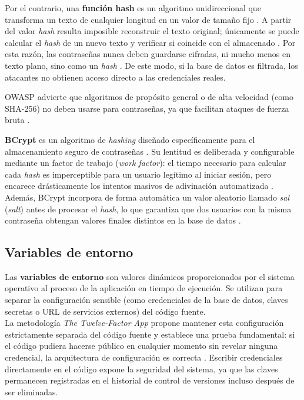 	Por el contrario, una \textbf{funci\'on hash} es un algoritmo unidireccional que transforma un texto de cualquier longitud en un valor de tamaño fijo \cite{owasp_password_storage}. A partir del valor \textit{hash} resulta imposible reconstruir el texto original; \'unicamente se puede calcular el \textit{hash} de un nuevo texto y verificar si coincide con el almacenado \cite{owasp_password_storage}. Por esta raz\'on, las contraseñas nunca deben guardarse cifradas, ni mucho menos en texto plano, sino como un \textit{hash} \cite{owasp_password_storage}. De este modo, si la base de datos es filtrada, los atacantes no obtienen acceso directo a las credenciales reales.
	
	\begin{warnbox}
		OWASP advierte que algoritmos de prop\'osito general o de alta velocidad (como SHA-256) no deben usarse para contraseñas, ya que facilitan ataques de fuerza bruta \cite{owasp_password_storage}.
	\end{warnbox}
	
	\textbf{BCrypt} es un algoritmo de \textit{hashing} diseñado espec\'ificamente para el almacenamiento seguro de contraseñas \cite{owasp_password_storage}. Su lentitud es deliberada y configurable mediante un factor de trabajo (\textit{work factor}): el tiempo necesario para calcular cada \textit{hash} es imperceptible para un usuario leg\'itimo al iniciar sesi\'on, pero encarece dr\'asticamente los intentos masivos de adivinaci\'on automatizada \cite{owasp_password_storage}. Adem\'as, BCrypt incorpora de forma autom\'atica un valor aleatorio llamado \textit{sal} (\textit{salt}) antes de procesar el \textit{hash}, lo que garantiza que dos usuarios con la misma contraseña obtengan valores finales distintos en la base de datos \cite{owasp_password_storage}.
	
	\subsection{Variables de entorno}
	Las \textbf{variables de entorno} son valores din\'amicos proporcionados por el sistema operativo al proceso de la aplicaci\'on en tiempo de ejecuci\'on. Se utilizan para separar la configuraci\'on sensible (como credenciales de la base de datos, claves secretas o URL de servicios externos) del c\'odigo fuente. \\
	
	La metodolog\'ia \textit{The Twelve-Factor App} propone mantener esta configuraci\'on estrictamente separada del c\'odigo fuente y establece una prueba fundamental: si el c\'odigo pudiera hacerse p\'ublico en cualquier momento sin revelar ninguna credencial, la arquitectura de configuraci\'on es correcta \cite{twelve_factor_config}. Escribir credenciales directamente en el c\'odigo expone la seguridad del sistema, ya que las claves permanecen registradas en el historial de control de versiones incluso despu\'es de ser eliminadas. 
	

